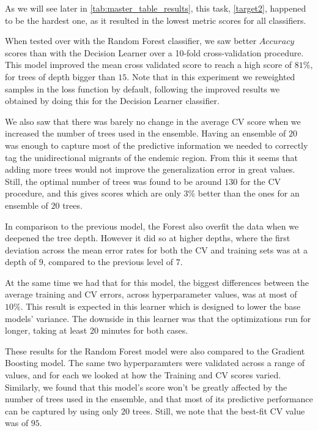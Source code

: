 As we will see later in \cref{tab:master_table_results}, this task, \cref{target2}, happened to be the hardest one, as it resulted in the lowest metric scores for all classifiers.

When tested over with the Random Forest classifier, we saw better $Accuracy$ scores than with the Decision Learner over a 10-fold cross-validation procedure.
This model improved the mean cross validated score to reach a high score of $81\%$, for trees of depth bigger than $15$.
Note that in this experiment we reweighted samples in the loss function by default, following the improved results we obtained by doing this for the Decision Learner classifier.

We also saw that there was barely no change in the average CV score when we increased the number of trees used in the ensemble.
Having an ensemble of $20$ was enough to capture most of the predictive information we needed to correctly tag the unidirectional migrants of the endemic region.
From this it seems that adding more trees would not improve the generalization error in great values.
Still, the optimal number of trees was found to be around $130$ for the CV procedure, and this gives scores which are only $3\%$ better than the ones for an ensemble of $20$ trees.

In comparison to the previous model, the Forest also overfit the data when we deepened the tree depth.
However it did so at higher depths, where the first deviation across the mean error rates for both the CV and training sets was at a depth of $9$, compared to the previous level of $7$.

At the same time we had that for this model, the biggest differences between the average training and CV errors, across hyperparameter values, was at most of $10\%$.
This result is expected in this learner which is designed to lower the base models' variance.
The downside in this learner was that the optimizations run for longer, taking at least 20 minutes for both cases.

These results for the Random Forest model were also compared to the Gradient Boosting model.
The same two hyperparamters were validated across a range of values, and for each we looked at how the Training and CV scores varied.
Similarly, we found that this model's score won't be greatly affected by the number of trees used in the ensemble, and that most of its predictive performance can be captured by using only $20$ trees.
Still, we note that the best-fit CV value was of $95$.

